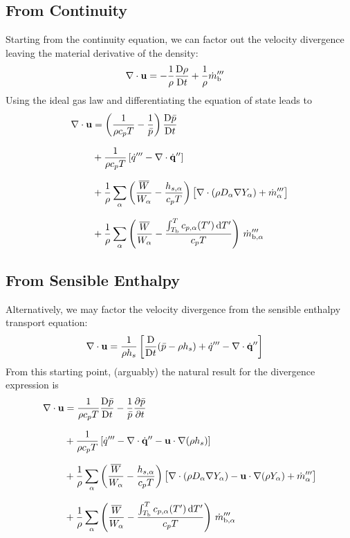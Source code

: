 \subsection{From Continuity}
Starting from the continuity equation, we can factor out the velocity divergence leaving the material derivative of the density:
\begin{align}
\nabla\cdot\mathbf{u} &= -\frac{1}{\rho}\frac{\mbox{D}\rho}{\mbox{D} t} + \frac{1}{\rho} \dot{m}_{\rm b}'''
\end{align}
Using the ideal gas law and differentiating the equation of state leads to
\begin{align}
\label{eqn_div_1}
\nabla\cdot\mathbf{u} &= \left(\frac{1}{\rho c_p T} - \frac{1}{\bar{p}} \right)\frac{\mbox{D} \bar{p}}{\mbox{D} t} \notag\\[.1in]
&+ \frac{1}{\rho c_p T} \left[ \dot{q}^{\prime\prime\prime} - \nabla\cdot \dot{\mathbf{q}}^{\prime\prime} \right] \notag\\[.1in]
&+ \frac{1}{\rho} \sum_\alpha \left(\frac{\overline{W}}{W_\alpha} - \frac{h_{s,\alpha}}{c_p T} \right) \big[ \nabla\cdot (\rho D_\alpha \nabla Y_\alpha) + \dot{m}_\alpha^{\prime\prime\prime} \big] \notag \\[.1in]
&+ \frac{1}{\rho} \sum_\alpha \left(\frac{\overline{W}}{W_\alpha} - \frac{\int_{T_{\rm b}}^T c_{p,\alpha}(T') \, {\rm d}T'}{c_p T} \right) \, \dot{m}_{\rm b,\alpha}^{\prime\prime\prime}
\end{align}

\subsection{From Sensible Enthalpy}
Alternatively, we may factor the velocity divergence from the sensible enthalpy transport equation:
\begin{align}
\label{eqn_div_new}
\nabla\cdot\mathbf{u} &= \frac{1}{\rho h_s} \left[ \frac{\mbox{D}}{\mbox{D} t}(\bar{p}-\rho h_s) + \dot{q}^{\prime\prime\prime} - \nabla\cdot \dot{\mathbf{q}}^{\prime\prime} \right]
\end{align}
From this starting point, (arguably) the natural result for the divergence expression is
\begin{align}
\label{eqn_div_2}
\nabla\cdot\mathbf{u} &= \frac{1}{\rho c_p T}\frac{\mbox{D} \bar{p}}{\mbox{D} t} - \frac{1}{\bar{p}} \frac{\partial \bar{p}}{\partial t} \notag\\[.1in]
&+ \frac{1}{\rho c_p T}\left[ \dot{q}^{\prime\prime\prime} - \nabla\cdot \dot{\mathbf{q}}^{\prime\prime} - \mathbf{u} \cdot\nabla (\rho h_s) \right] \notag\\[.1in]
&+ \frac{1}{\rho} \sum_\alpha \left(\frac{\overline{W}}{W_\alpha} - \frac{h_{s,\alpha}}{c_p T} \right) \big[ \nabla\cdot (\rho D_\alpha \nabla Y_\alpha) - \mathbf{u} \cdot \nabla (\rho Y_\alpha) + \dot{m}_\alpha^{\prime\prime\prime} \big] \notag \\[.1in]
&+ \frac{1}{\rho} \sum_\alpha \left(\frac{\overline{W}}{W_\alpha} - \frac{\int_{T_{\rm b}}^T c_{p,\alpha}(T') \, {\rm d}T'}{c_p T} \right) \, \dot{m}_{\rm b,\alpha}^{\prime\prime\prime}
\end{align}

